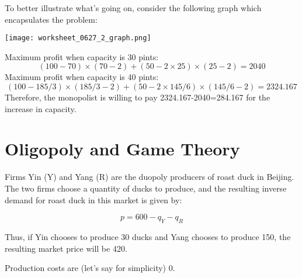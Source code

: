 \documentclass{article}
\newenvironment{solution}{\color{red}}{\color{black}}
\begin{document}
\begin{solution}
\begin{enumerate}
To better illustrate what's going on, consider the following graph which encapsulates the problem:

\texttt{[image: worksheet\_0627\_2\_graph.png]}

Maximum profit when capacity is 30 pints: $$(100-70)\times(70-2)+(50-2\times 25)\times(25-2)=2040$$
Maximum profit when capacity is 40 pints: $$(100-185/3)\times(185/3-2)+(50-2\times145/6)\times(145/6-2)=2324.167$$
Therefore, the monopolist is willing to pay 2324.167-2040=284.167 for the increase in capacity.
\end{enumerate}
\end{solution}


\section*{Oligopoly and Game Theory}

Firms Yin (Y) and Yang (R) are the duopoly producers of roast duck in Beijing. The two firms choose a quantity of ducks to produce, and the resulting inverse demand for roast duck in this market is given by:

\[ p = 600 - q_Y - q_R \]

Thus, if Yin chooses to produce 30 ducks and Yang chooses to produce 150, the resulting market price will be 420.

Production costs are (let's say for simplicity) 0.
\end{document}
